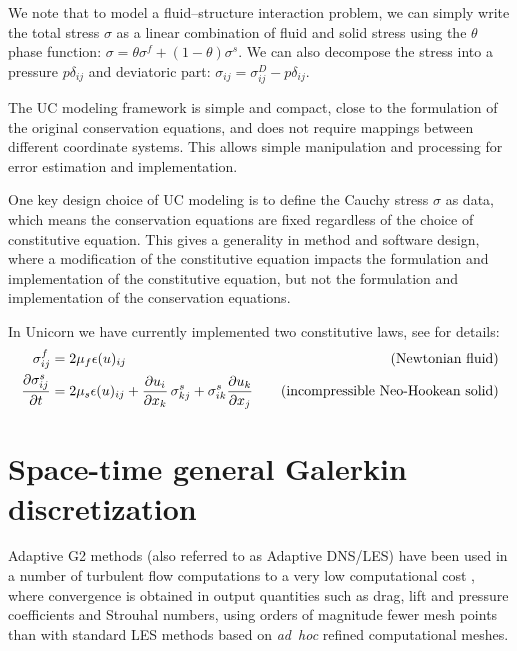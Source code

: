 We note that to model a fluid--structure interaction problem, we can
simply write the total stress $\sigma$ as a linear combination of
fluid and solid stress using the $\theta$ phase function: $\sigma
= \theta \sigma^f + (1 - \theta) \sigma^s$. We can also decompose the
stress into a pressure $p \delta_{ij}$ and deviatoric part: $\sigma_{ij} = \sigma^D_{ij} - p \delta_{ij}$.

The UC modeling framework is simple and compact, close to the
formulation of the original conservation equations, and does not
require mappings between different coordinate systems. This allows
simple manipulation and processing for error estimation and
implementation.

One key design choice of UC modeling is to define the Cauchy stress
$\sigma$ as data, which means the conservation equations are fixed
regardless of the choice of constitutive equation. This gives a
generality in method and software design, where a modification of the
constitutive equation impacts the formulation and implementation of
the constitutive equation, but not the formulation and implementation
of the conservation equations.

In Unicorn we have currently implemented two constitutive laws, see \citet{HoffmanJanssonStockli2011} for details:
\begin{align}
\sigma^f_{ij} &= 2\mu_f \epsilon(u)_{ij} \quad &\text{(Newtonian fluid)}\\
\frac{\partial \sigma^s_{ij}}{\partial t} &= 2\mu_s \epsilon(u)_{ij} + \frac{\partial u_i}{\partial x_k} \thinspace \sigma^s_{kj} + \sigma^s_{ik} \frac{\partial u_k}{\partial x_j} \quad &\text{(incompressible Neo-Hookean solid)}
\end{align}

\section{Space-time general Galerkin discretization}

Adaptive G2 methods (also referred to as Adaptive DNS/LES) have been
used in a number of turbulent flow computations to a very low
computational cost
\citep{Hoffman2005,HoffmanJohnson2006b,Hoffman2006,HoffmanJohnson2007,Hoffman2009,HoffmanJansson2009,VilelaJanssonEtAl2010},
where convergence is obtained in output quantities such as drag, lift
and pressure coefficients and Strouhal numbers, using orders of
magnitude fewer mesh points than with standard LES methods based on
\emph{ad~hoc} refined computational meshes.

